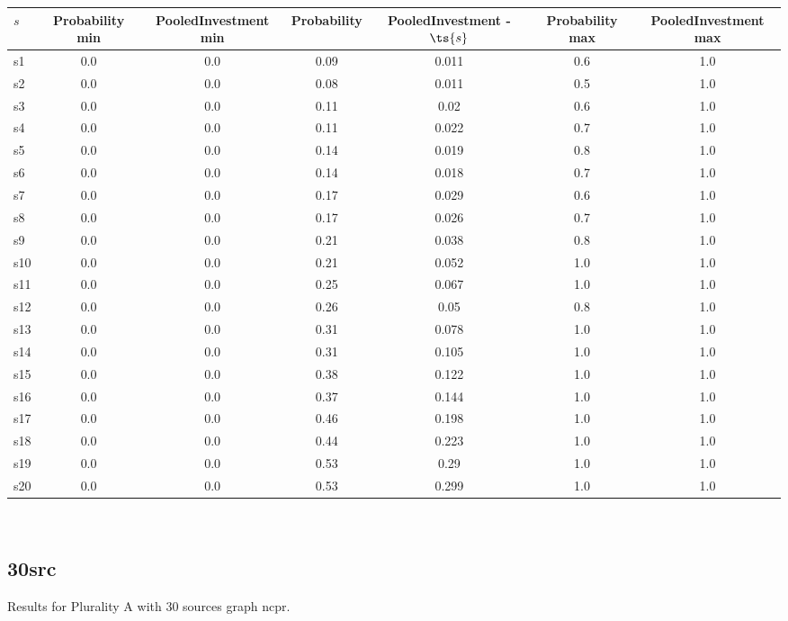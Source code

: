\documentclass{article}
\begin{document}
\noindent\begin{tabular}{|l|c|c|c|c|c|c|}
\hline
$s$& Probability min & PooledInvestment min & Probability & PooledInvestment - $\ts{s}$ & Probability max & PooledInvestment max\\
\hline
s1 &0.0 & 0.0 & 0.09 & 0.011 & 0.6 & 1.0\\
\hline
s2 &0.0 & 0.0 & 0.08 & 0.011 & 0.5 & 1.0\\
\hline
s3 &0.0 & 0.0 & 0.11 & 0.02 & 0.6 & 1.0\\
\hline
s4 &0.0 & 0.0 & 0.11 & 0.022 & 0.7 & 1.0\\
\hline
s5 &0.0 & 0.0 & 0.14 & 0.019 & 0.8 & 1.0\\
\hline
s6 &0.0 & 0.0 & 0.14 & 0.018 & 0.7 & 1.0\\
\hline
s7 &0.0 & 0.0 & 0.17 & 0.029 & 0.6 & 1.0\\
\hline
s8 &0.0 & 0.0 & 0.17 & 0.026 & 0.7 & 1.0\\
\hline
s9 &0.0 & 0.0 & 0.21 & 0.038 & 0.8 & 1.0\\
\hline
s10 &0.0 & 0.0 & 0.21 & 0.052 & 1.0 & 1.0\\
\hline
s11 &0.0 & 0.0 & 0.25 & 0.067 & 1.0 & 1.0\\
\hline
s12 &0.0 & 0.0 & 0.26 & 0.05 & 0.8 & 1.0\\
\hline
s13 &0.0 & 0.0 & 0.31 & 0.078 & 1.0 & 1.0\\
\hline
s14 &0.0 & 0.0 & 0.31 & 0.105 & 1.0 & 1.0\\
\hline
s15 &0.0 & 0.0 & 0.38 & 0.122 & 1.0 & 1.0\\
\hline
s16 &0.0 & 0.0 & 0.37 & 0.144 & 1.0 & 1.0\\
\hline
s17 &0.0 & 0.0 & 0.46 & 0.198 & 1.0 & 1.0\\
\hline
s18 &0.0 & 0.0 & 0.44 & 0.223 & 1.0 & 1.0\\
\hline
s19 &0.0 & 0.0 & 0.53 & 0.29 & 1.0 & 1.0\\
\hline
s20 &0.0 & 0.0 & 0.53 & 0.299 & 1.0 & 1.0\\
\hline
\end{tabular}\\

\newpage

\subsection{30src}

\noindent Results for Plurality A with 30 sources graph ncpr.
\end{document}

